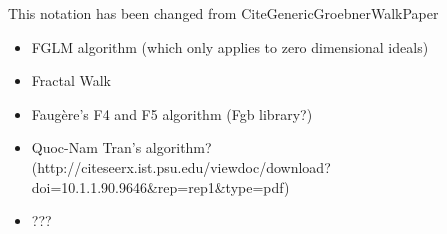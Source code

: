 \documentclass[12pt,a4paper]{report}
\begin{document}

This notation has been changed from CiteGenericGroebnerWalkPaper








\begin{itemize}
    \item FGLM algorithm (which only applies to zero dimensional ideals)
    \item Fractal Walk
    \item Faugère's F4 and F5 algorithm (Fgb library?)
    \item Quoc-Nam Tran's algorithm? (http://citeseerx.ist.psu.edu/viewdoc/download?doi=10.1.1.90.9646&rep=rep1&type=pdf)
    \item ???
\end{itemize}
\end{document}
